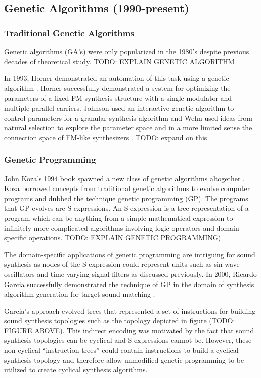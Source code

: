 \documentclass[12pt]{article}
\begin{document}
\subsection{Genetic Algorithms (1990-present)}
\subsubsection{Traditional Genetic Algorithms}
Genetic algorithms (GA's) were only popularized in the 1980's despite previous decades of theoretical study. TODO: EXPLAIN GENETIC ALGORITHM

In 1993, Horner demonstrated an automation of this task using a genetic algorithm \citep{horner1993machine}. Horner successfully demonstrated a system for optimizing the parameters of a fixed FM synthesis structure with a single modulator and multiple parallel carriers. Johnson used an interactive genetic algorithm to control parameters for a granular synthesis algorithm \citep{johnson1999exploring} and Wehn used ideas from natural selection to explore the parameter space and in a more limited sense the connection space of FM-like synthesizers \citep{wehn1998using}. TODO: expand on this

\subsubsection{Genetic Programming}
John Koza's 1994 book spawned a new class of genetic algorithms altogether \citep{koza1992genetic}. Koza borrowed concepts from traditional genetic algorithms to evolve computer programs and dubbed the technique genetic programming (GP). The programs that GP evolves are S-expressions. An S-expression is a tree representation of a program which can be anything from a simple mathematical expression to infinitely more complicated algorithms involving logic operators and domain-specific operations. TODO: EXPLAIN GENETIC PROGRAMMING)
			
The domain-specific applications of genetic programming are intriguing for sound synthesis as nodes of the S-expression could represent units such as sin wave oscillators and time-varying signal filters as discussed previously. In 2000, Ricardo Garcia successfully demonstrated the technique of GP in the domain of synthesis algorithm generation for target sound matching \citep{garcia2000towards}.

Garcia's approach evolved trees that represented a set of instructions for building sound synthesis topologies such as the topology depicted in figure (TODO: FIGURE ABOVE). This indirect encoding was motivated by the fact that sound synthesis topologies can be cyclical and S-expressions cannot be. However, these non-cyclical ``instruction trees'' could contain instructions to build a cyclical synthesis topology and therefore allow unmodified genetic programming to be utilized to create cyclical synthesis algorithms.
\end{document}

